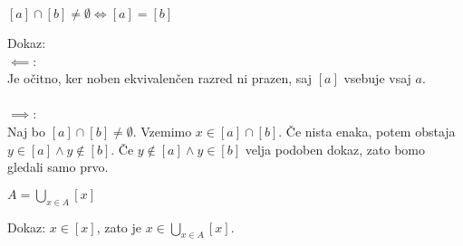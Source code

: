 \begin{trditev}
    $[a] \cap [b] \neq \emptyset \iff [a] = [b]$
\end{trditev}
Dokaz: \\
$\impliedby$: \\
Je očitno, ker noben ekvivalenčen razred ni prazen, saj $[a]$ vsebuje vsaj $a$.\\
\\
$\implies$:\\
Naj bo $[a] \cap [b] \neq \emptyset$.
Vzemimo $x \in [a] \cap [b]$.
Če nista enaka, potem obstaja $y \in [a] \wedge y \notin [b]$.
Če $y \notin [a] \wedge y \in [b]$ velja podoben dokaz, zato bomo gledali samo prvo.

\begin{trditev}
    $A = \bigcup_{x \in A} [x]$
\end{trditev}
Dokaz:
$x \in [x]$, zato je $x \in \bigcup_{x \in A} [x]$.



